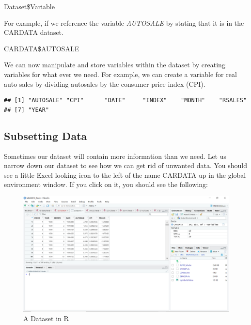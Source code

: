 \documentclass[
]{book}
\newenvironment{Shaded}{\begin{snugshade}}{\end{snugshade}}
\newcommand{\FunctionTok}[1]{\textcolor[rgb]{0.00,0.00,0.00}{#1}}
\newcommand{\NormalTok}[1]{#1}
\newcommand{\OtherTok}[1]{\textcolor[rgb]{0.56,0.35,0.01}{#1}}
\newcommand{\SpecialCharTok}[1]{\textcolor[rgb]{0.00,0.00,0.00}{#1}}
\begin{document}
Dataset\$Variable

For example, if we reference the variable \emph{AUTOSALE} by stating that it is in the CARDATA dataset.

CARDATA\$AUTOSALE

We can now manipulate and store variables within the dataset by creating variables for what ever we need. For example, we can create a variable for real auto sales by dividing autosales by the consumer price index (CPI).

\begin{Shaded}
\end{Shaded}

\begin{verbatim}
## [1] "AUTOSALE" "CPI"      "DATE"     "INDEX"    "MONTH"    "RSALES"  
## [7] "YEAR"
\end{verbatim}

\hypertarget{subsetting-data}{%
\subsection{Subsetting Data}\label{subsetting-data}}

Sometimes our dataset will contain more information than we need. Let us narrow down our dataset to see how we can get rid of unwanted data. You should see a little Excel looking icon to the left of the name CARDATA up in the global environment window. If you click on it, you should see the following:

\begin{figure}

{\centering \includegraphics[width=0.75\linewidth]{images/Screenshot4} 

}

\caption{A Dataset in R}\label{fig:unnamed-chunk-40}
\end{figure}
\end{document}
